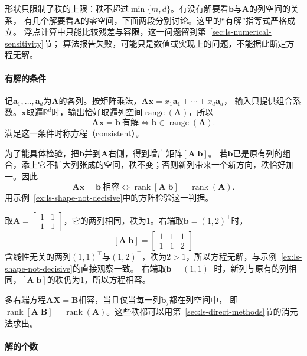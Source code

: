 形状只限制了秩的上限：秩不超过$\min\{m,d\}$。有没有解要看$\bm b$与$\bm A$的列空间的关系，
有几个解要看$\bm A$的零空间，下面两段分别讨论。这里的“有解”指等式严格成立。
浮点计算中只能比较残差与容限，这一问题留到第~\ref{sec:ls-numerical-sensitivity}节；
算法报告失败，可能只是数值或实现上的问题，不能据此断定方程无解。

\paragraph{有解的条件}
\label{sec:ls-compatibility}

记$\bm a_1,\ldots,\bm a_d$为$\bm A$的各列。按矩阵乘法，$\bm A\bm x=x_1\bm a_1+\cdots+x_d\bm a_d$，
输入只提供组合系数。$\bm x$取遍$\mathbb R^d$时，输出恰好取遍列空间$\operatorname{range}(\bm A)$，所以
\[
 \bm A\bm x=\bm b\ \text{有解}\iff\bm b\in\operatorname{range}(\bm A).
\]
满足这一条件时称方程（consistent）。

为了能具体检验，把$\bm b$并到$\bm A$右侧，得到增广矩阵$[\bm A\;\bm b]$。
若$\bm b$已是原有列的组合，添上它不扩大列张成的空间，秩不变；否则新列带来一个新方向，秩恰好加一。因此
\begin{equation}
 \bm A\bm x=\bm b\ \text{相容}\iff
 \operatorname{rank}[\bm A\;\bm b]=\operatorname{rank}(\bm A).
 \label{eq:ls-augmented-rank}
\end{equation}
用示例~\ref{ex:ls-shape-not-decisive}中的方阵检验这一判据。

\begin{example}[增广矩阵的秩]
\label{ex:ls-augmented-rank-check}
取$\bm A=\left[\begin{smallmatrix}1&1\\1&1\end{smallmatrix}\right]$，它的两列相同，秩为$1$。右端取$\bm b=(1,2)^\top$时，
\[
 [\bm A\;\bm b]=\begin{bmatrix}1&1&1\\1&1&2\end{bmatrix}
\]
含线性无关的两列$(1,1)^\top$与$(1,2)^\top$，秩为$2>1$，所以方程无解，与示例~\ref{ex:ls-shape-not-decisive}的直接观察一致。
右端取$\bm b=(1,1)^\top$时，新列与原有的列相同，$[\bm A\;\bm b]$的秩仍为$1$，所以方程相容。
\end{example}

多右端方程$\bm A\bm X=\bm B$相容，当且仅当每一列$\bm b_j$都在列空间中，
即$\operatorname{rank}[\bm A\;\bm B]=\operatorname{rank}(\bm A)$。这些秩都可以用第~\ref{sec:ls-direct-methods}节的消元法求出。

\paragraph{解的个数}
\label{sec:ls-uniqueness-freedom}

